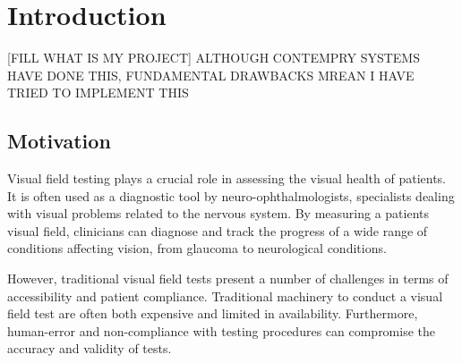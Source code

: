\documentclass{l4proj}
\begin{document}
%
%
%
%
%
%
%
%
\chapter{Introduction}
[FILL WHAT IS MY PROJECT] ALTHOUGH CONTEMPRY SYSTEMS HAVE DONE THIS, FUNDAMENTAL DRAWBACKS MREAN I HAVE TRIED TO IMPLEMENT THIS
\section{Motivation}
Visual field testing plays a crucial role in assessing the visual health of patients. It is often used as a diagnostic tool by neuro-ophthalmologists, specialists dealing with visual problems related to the nervous system. By measuring a patients visual field, clinicians can diagnose and track the progress of a wide range of conditions affecting vision, from glaucoma to neurological conditions. 

However, traditional visual field tests present a number of challenges in terms of accessibility and patient compliance. Traditional machinery to conduct a visual field test are often both expensive and limited in availability. Furthermore, human-error and non-compliance with testing procedures can compromise the accuracy and validity of tests. 
\end{document}
